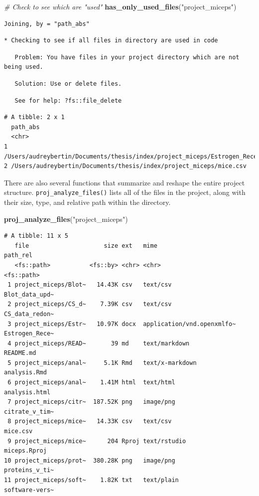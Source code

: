 \documentclass[12pt,twoside]{reedthesis}
\newenvironment{Shaded}{\begin{snugshade}}{\end{snugshade}}
\newcommand{\KeywordTok}[1]{\textcolor[rgb]{0.13,0.29,0.53}{\textbf{#1}}}
\newcommand{\StringTok}[1]{\textcolor[rgb]{0.31,0.60,0.02}{#1}}
\newcommand{\CommentTok}[1]{\textcolor[rgb]{0.56,0.35,0.01}{\textit{#1}}}
\newcommand{\NormalTok}[1]{#1}
\begin{document}
\begin{Shaded}
\begin{Highlighting}[]
\CommentTok{# Check to see which are "used"}
\KeywordTok{has_only_used_files}\NormalTok{(}\StringTok{"project_miceps"}\NormalTok{)}
\end{Highlighting}
\end{Shaded}
\begin{verbatim}
Joining, by = "path_abs"
\end{verbatim}
\begin{verbatim}
* Checking to see if all files in directory are used in code
\end{verbatim}
\begin{verbatim}
   Problem: You have files in your project directory which are not being used.
\end{verbatim}
\begin{verbatim}
   Solution: Use or delete files.
\end{verbatim}
\begin{verbatim}
   See for help: ?fs::file_delete
\end{verbatim}
\begin{verbatim}
# A tibble: 2 x 1
  path_abs                                                                      
  <chr>                                                                         
1 /Users/audreybertin/Documents/thesis/index/project_miceps/Estrogen_Receptors.~
2 /Users/audreybertin/Documents/thesis/index/project_miceps/mice.csv            
\end{verbatim}
There are also several functions that summarize and reshape the entire
project structure. \texttt{proj\_analyze\_files()} lists all of the
files in the project, along with their size, type, and relative path
within the directory.
\begin{Shaded}
\begin{Highlighting}[]
\KeywordTok{proj_analyze_files}\NormalTok{(}\StringTok{"project_miceps"}\NormalTok{)}
\end{Highlighting}
\end{Shaded}
\begin{verbatim}
# A tibble: 11 x 5
   file                     size ext   mime                       path_rel      
   <fs::path>           <fs::by> <chr> <chr>                      <fs::path>    
 1 project_miceps/Blot~   14.43K csv   text/csv                   Blot_data_upd~
 2 project_miceps/CS_d~    7.39K csv   text/csv                   CS_data_redon~
 3 project_miceps/Estr~   10.97K docx  application/vnd.openxmlfo~ Estrogen_Rece~
 4 project_miceps/READ~       39 md    text/markdown              README.md     
 5 project_miceps/anal~     5.1K Rmd   text/x-markdown            analysis.Rmd  
 6 project_miceps/anal~    1.41M html  text/html                  analysis.html 
 7 project_miceps/citr~  187.52K png   image/png                  citrate_v_tim~
 8 project_miceps/mice~   14.33K csv   text/csv                   mice.csv      
 9 project_miceps/mice~      204 Rproj text/rstudio               miceps.Rproj  
10 project_miceps/prot~  380.28K png   image/png                  proteins_v_ti~
11 project_miceps/soft~    1.82K txt   text/plain                 software-vers~
\end{verbatim}
\end{document}
